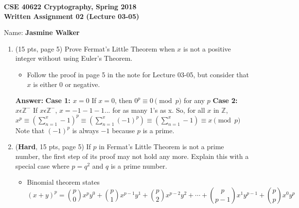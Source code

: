 \documentclass[10pt]{article}
\begin{document}






\begin{center}
	\textbf{CSE 40622 Cryptography, Spring 2018\\Written Assignment 02 (Lecture 03-05)}
\end{center}


Name: \textbf{Jasmine Walker}



\begin{enumerate}
	\item (15 pts, page 5) Prove Fermat's Little Theorem when $x$ is not a positive integer without using Euler's Theorem.
	\begin{itemize}
		\item Follow the proof in page 5 in the note for Lecture 03-05, but consider that $x$ is either 0 or negative.
	\end{itemize}

\textbf{Answer:} \newline \textbf{Case 1: $x=0$} \newline If $x=0$, then $0^{p}\equiv 0\pmod p$ for any $p$ \newline \newline \textbf{Case 2: $x \epsilon \mathbb{Z}^{-}$} \newline If $x \epsilon \mathbb{Z}^{-}$, $x = -1 - 1 - 1 ...$ for as many 1's as x. So, for all $x$ in $\mathbb{Z}$, \newline $x^{p}\equiv(\sum_{n = 1}^{x}-1)^{p}\equiv(\sum_{n = 1}^{x}(-1)^{p})\equiv(\sum_{n = 1}^{x}-1)\equiv x\pmod p$ \newline Note that $(-1)^{p}$ is always $-1$ because $p$ is a prime.
	
	
	\bigskip\item (\textbf{Hard}, 15 pts, page 5) If $p$ in Fermat's Little Theorem is not a prime number, the first step of its proof may not hold any more. Explain this with a special case where $p=q^2$ and $q$ is a prime number.
	\begin{itemize}
		\item Binomial theorem states
		\begin{displaymath}
		(x+y)^p=\binom{p}{0}x^py^0+\binom{p}{1}x^{p-1}y^1+\binom{p}{2}x^{p-2}y^2+\cdots +\binom{p}{p-1}x^1y^{p-1}+\binom{p}{p}x^0y^p
		\end{displaymath}
		

\end{itemize}
\end{enumerate}
\end{document}
